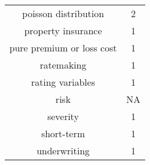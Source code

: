 \documentclass[]{book}
\theoremstyle{definition}
\theoremstyle{definition}
\theoremstyle{definition}
\theoremstyle{remark}
\begin{document}
\begin{longtable}[]{@{}cc@{}}
\begin{minipage}[t]{0.43\columnwidth}
poisson distribution\strut
\end{minipage} & \begin{minipage}[t]{0.30\columnwidth}\centering\strut
2\strut
\end{minipage}\tabularnewline
\begin{minipage}[t]{0.43\columnwidth}\centering\strut
property insurance\strut
\end{minipage} & \begin{minipage}[t]{0.30\columnwidth}\centering\strut
1\strut
\end{minipage}\tabularnewline
\begin{minipage}[t]{0.43\columnwidth}\centering\strut
pure premium or loss cost\strut
\end{minipage} & \begin{minipage}[t]{0.30\columnwidth}\centering\strut
1\strut
\end{minipage}\tabularnewline
\begin{minipage}[t]{0.43\columnwidth}\centering\strut
ratemaking\strut
\end{minipage} & \begin{minipage}[t]{0.30\columnwidth}\centering\strut
1\strut
\end{minipage}\tabularnewline
\begin{minipage}[t]{0.43\columnwidth}\centering\strut
rating variables\strut
\end{minipage} & \begin{minipage}[t]{0.30\columnwidth}\centering\strut
1\strut
\end{minipage}\tabularnewline
\begin{minipage}[t]{0.43\columnwidth}\centering\strut
risk\strut
\end{minipage} & \begin{minipage}[t]{0.30\columnwidth}\centering\strut
NA\strut
\end{minipage}\tabularnewline
\begin{minipage}[t]{0.43\columnwidth}\centering\strut
severity\strut
\end{minipage} & \begin{minipage}[t]{0.30\columnwidth}\centering\strut
1\strut
\end{minipage}\tabularnewline
\begin{minipage}[t]{0.43\columnwidth}\centering\strut
short-term\strut
\end{minipage} & \begin{minipage}[t]{0.30\columnwidth}\centering\strut
1\strut
\end{minipage}\tabularnewline
\begin{minipage}[t]{0.43\columnwidth}\centering\strut
underwriting\strut
\end{minipage} & \begin{minipage}[t]{0.30\columnwidth}\centering\strut
1\strut
\end{minipage}\tabularnewline
\bottomrule
\end{longtable}
\end{document}
